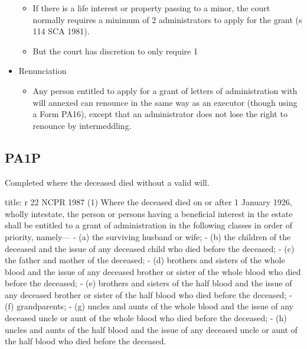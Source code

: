 \documentclass[
]{article}
\newenvironment{Shaded}{}{}
\newcommand{\NormalTok}[1]{#1}
\providecommand{\tightlist}{%
  \setlength{\itemsep}{0pt}\setlength{\parskip}{0pt}}
\begin{document}
\begin{itemize}
  \begin{itemize}
  \tightlist
  \item
    If there is a life interest or property passing to a minor, the
    court normally requires a minimum of 2 administrators to apply for
    the grant (s 114 SCA 1981).
  \item
    But the court has discretion to only require 1
  \end{itemize}
\item
  Renunciation

  \begin{itemize}
  \tightlist
  \item
    Any person entitled to apply for a grant of letters of
    administration with will annexed can renounce in the same way as an
    executor (though using a Form PA16), except that an administrator
    does not lose the right to renounce by intermeddling.
  \end{itemize}
\end{itemize}

\hypertarget{pa1p-1}{%
\subsection{PA1P}\label{pa1p-1}}

Completed where the deceased died without a valid will.

\begin{Shaded}
\begin{Highlighting}[]
\NormalTok{title: r 22 NCPR 1987}
\NormalTok{(1) Where the deceased died on or after 1 January 1926, wholly intestate, the person or persons having a beneficial interest in the estate shall be entitled to a grant of administration in the following classes in order of priority, namely—}
\NormalTok{{-} (a) the surviving husband or wife;}
\NormalTok{{-} (b) the children of the deceased and the issue of any deceased child who died before the deceased;}
\NormalTok{{-} (c) the father and mother of the deceased;}
\NormalTok{{-} (d) brothers and sisters of the whole blood and the issue of any deceased brother or sister of the whole blood who died before the deceased;}
\NormalTok{{-} (e) brothers and sisters of the half blood and the issue of any deceased brother or sister of the half blood who died before the deceased;}
\NormalTok{{-} (f) grandparents;}
\NormalTok{{-} (g) uncles and aunts of the whole blood and the issue of any deceased uncle or aunt of the whole blood who died before the deceased;}
\NormalTok{{-} (h) uncles and aunts of the half blood and the issue of any deceased uncle or aunt of the half blood who died before the deceased.}
\end{Highlighting}
\end{Shaded}
\end{document}
